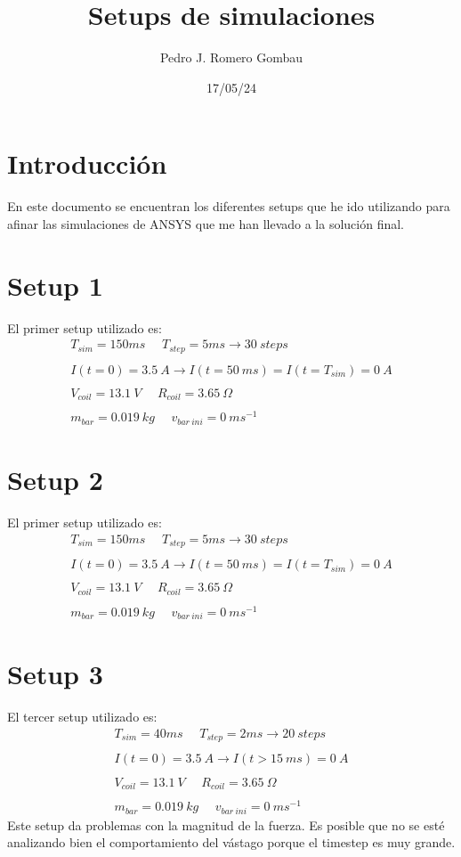 \documentclass{article}
\title{Setups de simulaciones}
\author{Pedro J. Romero Gombau}
\date{17/05/24}
\begin{document}
\maketitle

\section{Introducción}
En este documento se encuentran los diferentes setups que he ido utilizando para afinar las simulaciones de ANSYS que me han llevado a la solución final.
\section{Setup 1}
El primer setup utilizado es:
\begin{align*}
    T_{sim}=150ms~~~~~~T_{step}=5ms\to30~steps
    \\~\\
    I(t=0)=3.5~A\to I(t=50~ms)=I(t=T_{sim})=0~A
    \\~\\
    V_{coil}=13.1~V~~~~~~R_{coil}=3.65~\Omega
    \\~\\
    m_{bar}=0.019~kg~~~~~~v_{bar~ini}=0~ms^{-1}
\end{align*}

\section{Setup 2}
El primer setup utilizado es:
\begin{align*}
    T_{sim}=150ms~~~~~~T_{step}=5ms\to30~steps
    \\~\\
    I(t=0)=3.5~A\to I(t=50~ms)=I(t=T_{sim})=0~A
    \\~\\
    V_{coil}=13.1~V~~~~~~R_{coil}=3.65~\Omega
    \\~\\
    m_{bar}=0.019~kg~~~~~~v_{bar~ini}=0~ms^{-1}
\end{align*}

\section{Setup 3}
El tercer setup utilizado es:
\begin{align*}
    T_{sim}=40ms~~~~~~T_{step}=2ms\to20~steps
    \\~\\
    I(t=0)=3.5~A\to I(t>15~ms)=0~A
    \\~\\
    V_{coil}=13.1~V~~~~~~R_{coil}=3.65~\Omega
    \\~\\
    m_{bar}=0.019~kg~~~~~~v_{bar~ini}=0~ms^{-1}
\end{align*}
Este setup da problemas con la magnitud de la fuerza. Es posible que no se esté analizando bien el comportamiento del vástago porque el timestep es muy grande.
\end{document}

